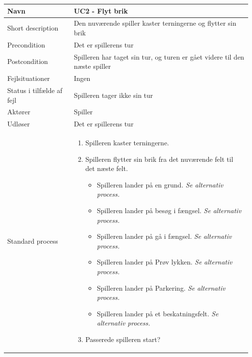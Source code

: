 \begin{center}
\begin{longtable}{|l|p{11cm}|}
\hline
Navn &  UC2 - Flyt brik\\
\hline
Short description & Den nuværende spiller kaster terningerne og flytter sin brik \\
\hline
Precondition & Det er spillerens tur \\
\hline
Postcondition & Spilleren har taget sin tur, og turen er gået videre til den næste spiller \\
\hline
Fejlsituationer & Ingen \\
\hline
Status i tilfælde af fejl & Spilleren tager ikke sin tur \\
\hline
Aktører & Spiller \\
\hline
Udløser & Det er spillerens tur \\
\hline
Standard process &  
\begin{minipage}[t]{1\textwidth}
  \begin{enumerate}
      \item Spilleren kaster terningerne.
      \item Spilleren flytter sin brik fra det nuværende felt \newline til det næste felt.
      \begin{itemize}
          \item Spilleren lander på en grund.\newline
          \emph{Se alternativ process.} 
          \item Spilleren lander på besøg i fængsel.\newline
          \emph{Se alternativ process.}
          \item Spilleren lander på gå i fængsel.\newline
          \emph{Se alternativ process.}
          \item Spilleren lander på Prøv lykken.\newline
          \emph{Se alternativ process.}
          \item Spilleren lander på Parkering.\newline
          \emph{Se alternativ process.}
          \item Spilleren lander på et beskatningsfelt.\newline
          \emph{Se alternativ process.}
      \end{itemize}
      \item Passerede spilleren start?
      \begin{itemize}

\end{itemize}
\end{enumerate}
\end{minipage}
\end{longtable}
\end{center}
